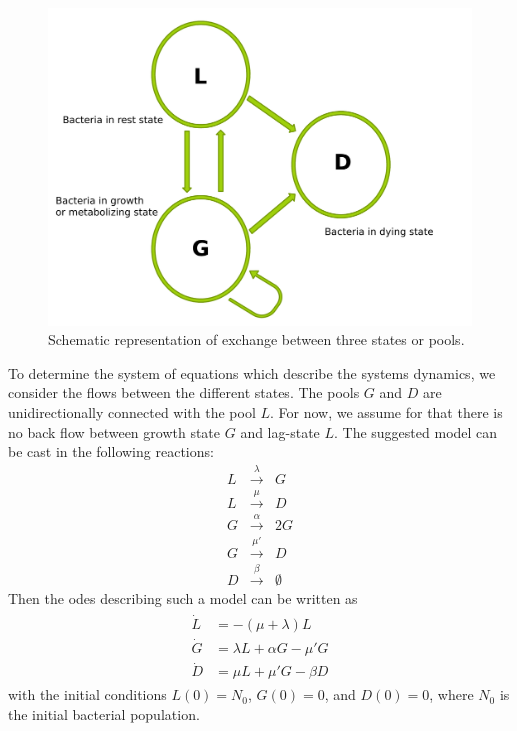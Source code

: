 \documentclass[10pt,A4paper]{article}
\numberwithin{equation}{section}
\begin{document}
\begin{figure}[t]
    \begin{center}
    \includegraphics[width=0.9\columnwidth]{Figures/TPM_fig.pdf}
    \caption{Schematic representation of exchange between three states or pools.}
    \label{fig:SchematicRep}
    \end{center}
\end{figure}
To determine the system of equations which describe the systems dynamics, we consider the flows between the different states.
The pools $G$ and $D$ are unidirectionally connected with the pool $L$.
For now, we assume for that there is no back flow between growth state $G$ and lag-state $L$.
The suggested model can be cast in the following reactions:
\begin{eqnarray}
    L &\stackrel{\lambda}{\longrightarrow} & G\\
    L &\stackrel{\mu}{\longrightarrow} & D\\
    G &\stackrel{\alpha}{\longrightarrow} & 2G\\
    G &\stackrel{\mu'}{\longrightarrow} & D\\
    D &\stackrel{\beta}{\longrightarrow} & \emptyset
\end{eqnarray}
Then the \acp{ode} describing such a model can be written as
\begin{align}\begin{split}
    \dot{L} &= -(\mu + \lambda) L\\
    \dot{G} &= \lambda L + \alpha G - \mu' G\\
    \dot{D} &= \mu  L + \mu' G- \beta D  
\end{split}\end{align}
with the initial conditions $L(0)=N_0$, $G(0)=0$, and $D(0)=0$, where $N_0$ is the initial bacterial population.
\end{document}
